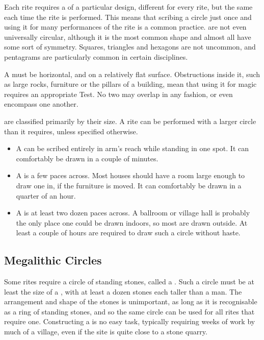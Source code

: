 Each rite requires a  of a particular design, different for every rite, but the same each time the rite is performed.
This means that scribing a circle just once and using it for many performances of the rite is a common practice.
 are not even universally circular, although it is the most common shape and almost all have some sort of symmetry.
Squares, triangles and hexagons are not uncommon, and pentagrams are particularly common in certain disciplines.

A  must be horizontal, and on a relatively flat surface.
Obstructions inside it, such as large rocks, furniture or the pillars of a building, mean that using it for magic requires an appropriate Test.
No two  may overlap in any fashion, or even encompass one another.

 are classified primarily by their size.
A rite can be performed with a larger circle than it requires, unless specified otherwise.
\begin{itemize}
	\item A  can be scribed entirely in arm's reach while standing in one spot.
		It can comfortably be drawn in a couple of minutes.
	\item A  is a few paces across.
		Most houses should have a room large enough to draw one in, if the furniture is moved.
		It can comfortably be drawn in a quarter of an hour.
	\item A  is at least two dozen paces across.
		A ballroom or village hall is probably the only place one could be drawn indoors, so most are drawn outside.
		At least a couple of hours are required to draw such a circle without haste.
\end{itemize}

\subsection{Megalithic Circles}

Some rites require a circle of standing stones, called a .
Such a circle must be at least the size of a , with at least a dozen stones each taller than a man.
The arrangement and shape of the stones is unimportant, as long as it is recognisable as a ring of standing stones, and so the same circle can be used for all rites that require one.
Constructing a  is no easy task, typically requiring weeks of work by much of a village, even if the site is quite close to a stone quarry.

